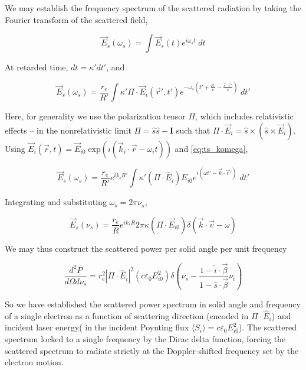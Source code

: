 We may establish the frequency spectrum of the scattered radiation by taking the Fourier transform of the scattered field,

\begin{equation}
 \vec{E}_s(\omega_s) = \int \vec{E}_s(t) e^{i\omega_s t} \;dt
\end{equation}

\noindent At retarded time, $dt = \kappa' dt'$, and

\begin{equation}\label{eq:Fourier}
 \vec{E}_s(\omega_s) = \frac{r_e}{R'} \int \kappa' \Pi \cdot \vec{E}_i(\vec{r}',t') e^{- \omega_s \left( t' + \frac{R'}{c} - \frac{\hat{s}\cdot\vec{r}'}{c}\right)} \;dt'
\end{equation}

\noindent Here, for generality we use the polarization tensor $\Pi$, which includes relativistic effects -- in the nonrelativistic limit $\Pi = \hat{s}\hat{s} - \textbf{I}$ such that $\Pi \cdot \vec{E}_i = \hat{s} \times \left( \hat{s} \times \vec{E}_i \right)$.  Using $\vec{E}_i(\vec{r},t) = \vec{E}_{i0} \;\mbox{exp}(i(\vec{k}_i \cdot \vec{r} - \omega_i t))$ and \cref{eq:ts_komega},

\begin{equation}
 \vec{E}_s(\omega_s) = \frac{r_e}{R'} e^{ik_s R'} \int \kappa' \left( \Pi \cdot \hat{E}_i \right) E_{i0} e^{i(\omega t' - \vec{k} \cdot \vec{r}')} \;dt'
\end{equation}

\noindent Integrating and substituting $\omega_s = 2\pi \nu_s$,

\begin{equation}
 \vec{E}_s (\nu_s) = \frac{r_e}{R} e^{ik_s R} 2\pi \kappa \left(\Pi \cdot \vec{E}_{i0}\right) \delta(\vec{k}\cdot\vec{v} - \omega)
\end{equation}

\noindent We may thus construct the scattered power per solid angle per unit frequency

\begin{equation}\label{eq:ts_powerspectrumsingle}
 \frac{d^2 P}{d\Omega d\nu_s} = r_e^2 \left| \Pi \cdot \hat{E}_i \right|^2 \left( c \varepsilon_0 E_{i0}^2 \right) \delta \left( \nu_s - \frac{1 - \hat{i} \cdot \vec{\beta}}{1 - \hat{s} \cdot \vec{\beta}} \nu_i \right)
\end{equation}

\noindent So we have established the scattered power spectrum in solid angle and frequency of a single electron as a function of scattering direction (encoded in $\Pi \cdot \hat{E}_i$) and incident laser energy( in the incident Poynting flux $\langle S_i \rangle = c \varepsilon_0 E_{i0}^2$).  The scattered spectrum locked to a single frequency by the Dirac delta function, forcing the scattered spectrum to radiate strictly at the Doppler-shifted frequency set by the electron motion.

